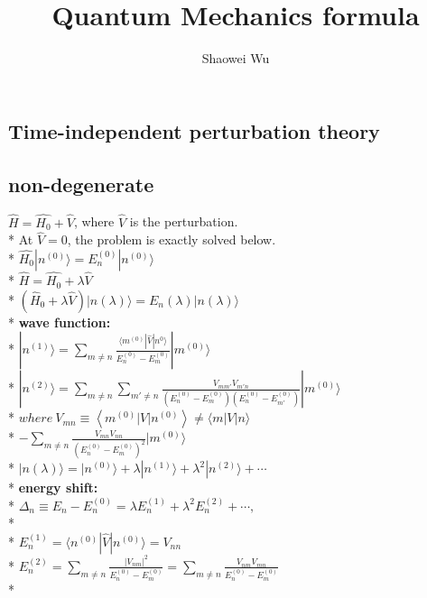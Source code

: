 \documentclass[10pt, oneside]{article}   	%
\title{Quantum Mechanics formula}
\author{Shaowei Wu}
\begin{document}
\maketitle
\begin{multicols}{2}
\setlength{\columnseprule}{0.4pt}

\section{Time-independent perturbation theory}
\subsection{non-degenerate}
$\hat{H}=\hat{H_0}+\hat{V}$, where $\hat{V}$ is the perturbation.\\*
At $\hat{V}=0$, the problem is exactly solved below.\\*
$\hat{H_0} |n^{(0)}\rangle=E_n^{(0)}|n^{(0)}\rangle$\\*
$\hat{H}=\hat{H_0}+\lambda\hat{V}$\\*
$(\hat{H}_{0}+\lambda \hat{V})|n(\lambda)\rangle= E_{n}(\lambda)|n(\lambda)\rangle$\\*
\textbf{wave function:}\\*
$|n^{(1)}\rangle=\sum\limits_{m\neq n}\frac{\langle m^{(0)}|\hat{V}|n^0\rangle}{E_n^{(0)}-E_m^{(0)}}|m^{(0)}\rangle$\\*
$|n^{(2)}\rangle=\sum\limits_{m \neq n} \sum\limits_{m' \neq n} \frac{V_{m m'} V_{m' n}}{(E_{n}^{(0)}-E_{m}^{(0)})(E_{n}^{(0)}-E_{m'}^{(0)})}|m^{(0)}\rangle$\\*
$where\: V_{m n} \equiv\left\langle m^{(0)}|V| n^{(0)}\right\rangle \not=\langle m|V| n\rangle$\\*
$-\sum\limits_{m \neq n} \frac{ V_{m n} V_{n n}}{(E_{n}^{(0)}-E_{m}^{(0)})^{2}}|m^{(0)}\rangle$\\*
$|n(\lambda)\rangle=|n^{(0)}\rangle+\lambda|n^{(1)}\rangle+\lambda^2 |n^{(2)}\rangle+\cdots$\\*
\textbf{energy shift:}\\*
$\Delta_{n} \equiv E_{n}-E_{n}^{(0)}=\lambda E_{n}^{(1)}+\lambda^{2} E_{n}^{(2)}+\cdots, $\\*
\\*
$E_{n}^{(1)}=\langle n^{(0)}|\hat{V}|n^{(0)}\rangle=V_{nn}$\\*
$E_{n}^{(2)}=\sum\limits_{m \neq n} \frac{\left|V_{n m}\right|^{2}}{E_{n}^{(0)}-E_{m}^{(0)}}=\sum\limits_{m \neq n} \frac{V_{n m}V_{m n}}{E_{n}^{(0)}-E_{m}^{(0)}}$\\*

\end{multicols}
\end{document}
